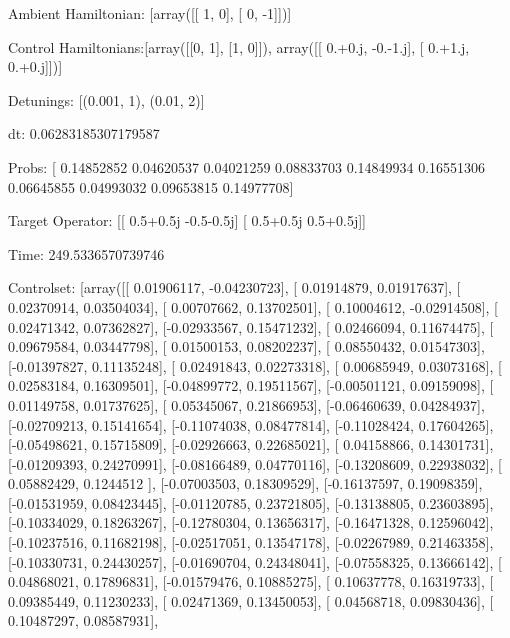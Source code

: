 \documentclass{article}
\begin{document}
    

\newpage

Ambient Hamiltonian: [array([[ 1,  0],
       [ 0, -1]])]

Control Hamiltonians:[array([[0, 1],
       [1, 0]]), array([[ 0.+0.j, -0.-1.j],
       [ 0.+1.j,  0.+0.j]])]

Detunings: [(0.001, 1), (0.01, 2)]

 dt: 0.06283185307179587

Probs: [ 0.14852852  0.04620537  0.04021259  0.08833703  0.14849934  0.16551306
  0.06645855  0.04993032  0.09653815  0.14977708]

Target Operator: [[ 0.5+0.5j -0.5-0.5j]
 [ 0.5+0.5j  0.5+0.5j]]

Time: 249.5336570739746

Controlset: [array([[ 0.01906117, -0.04230723],
       [ 0.01914879,  0.01917637],
       [ 0.02370914,  0.03504034],
       [ 0.00707662,  0.13702501],
       [ 0.10004612, -0.02914508],
       [ 0.02471342,  0.07362827],
       [-0.02933567,  0.15471232],
       [ 0.02466094,  0.11674475],
       [ 0.09679584,  0.03447798],
       [ 0.01500153,  0.08202237],
       [ 0.08550432,  0.01547303],
       [-0.01397827,  0.11135248],
       [ 0.02491843,  0.02273318],
       [ 0.00685949,  0.03073168],
       [ 0.02583184,  0.16309501],
       [-0.04899772,  0.19511567],
       [-0.00501121,  0.09159098],
       [ 0.01149758,  0.01737625],
       [ 0.05345067,  0.21866953],
       [-0.06460639,  0.04284937],
       [-0.02709213,  0.15141654],
       [-0.11074038,  0.08477814],
       [-0.11028424,  0.17604265],
       [-0.05498621,  0.15715809],
       [-0.02926663,  0.22685021],
       [ 0.04158866,  0.14301731],
       [-0.01209393,  0.24270991],
       [-0.08166489,  0.04770116],
       [-0.13208609,  0.22938032],
       [ 0.05882429,  0.1244512 ],
       [-0.07003503,  0.18309529],
       [-0.16137597,  0.19098359],
       [-0.01531959,  0.08423445],
       [-0.01120785,  0.23721805],
       [-0.13138805,  0.23603895],
       [-0.10334029,  0.18263267],
       [-0.12780304,  0.13656317],
       [-0.16471328,  0.12596042],
       [-0.10237516,  0.11682198],
       [-0.02517051,  0.13547178],
       [-0.02267989,  0.21463358],
       [-0.10330731,  0.24430257],
       [-0.01690704,  0.24348041],
       [-0.07558325,  0.13666142],
       [ 0.04868021,  0.17896831],
       [-0.01579476,  0.10885275],
       [ 0.10637778,  0.16319733],
       [ 0.09385449,  0.11230233],
       [ 0.02471369,  0.13450053],
       [ 0.04568718,  0.09830436],
       [ 0.10487297,  0.08587931],
\end{document}
